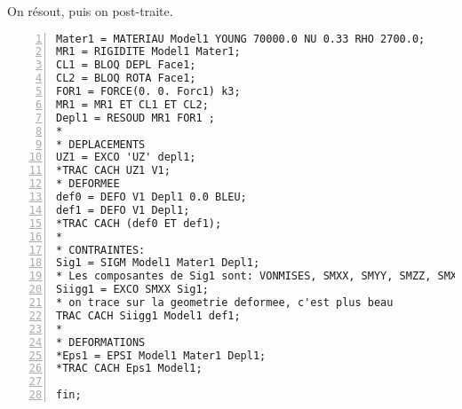 \medskip
On résout, puis on post-traite.

\begin{Verbatim}[numbers=left,numbersep=3pt,firstnumber=last]
Mater1 = MATERIAU Model1 YOUNG 70000.0 NU 0.33 RHO 2700.0;
MR1 = RIGIDITE Model1 Mater1;
CL1 = BLOQ DEPL Face1;
CL2 = BLOQ ROTA Face1;
FOR1 = FORCE(0. 0. Forc1) k3;
MR1 = MR1 ET CL1 ET CL2;
Depl1 = RESOUD MR1 FOR1 ;
*
* DEPLACEMENTS
UZ1 = EXCO 'UZ' depl1;
*TRAC CACH UZ1 V1;
* DEFORMEE
def0 = DEFO V1 Depl1 0.0 BLEU;
def1 = DEFO V1 Depl1;
*TRAC CACH (def0 ET def1);
*
* CONTRAINTES: 
Sig1 = SIGM Model1 Mater1 Depl1;
* Les composantes de Sig1 sont: VONMISES, SMXX, SMYY, SMZZ, SMXY, SMXZ, SMYZ
Siigg1 = EXCO SMXX Sig1;
* on trace sur la geometrie deformee, c'est plus beau
TRAC CACH Siigg1 Model1 def1;
*
* DEFORMATIONS
*Eps1 = EPSI Model1 Mater1 Depl1;
*TRAC CACH Eps1 Model1;

fin;
\end{Verbatim}
